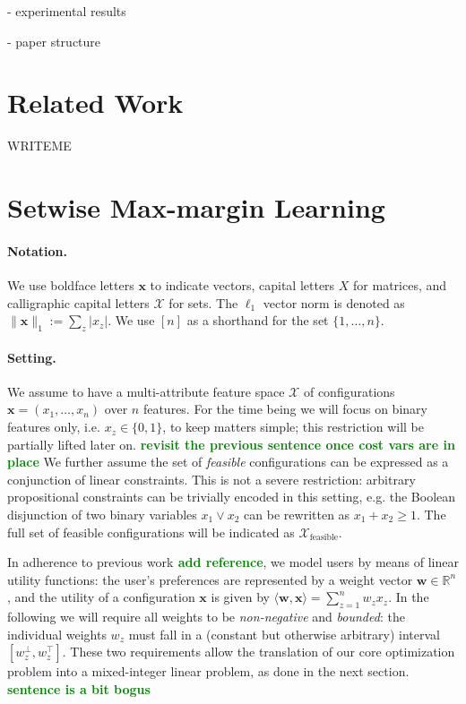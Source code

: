 \documentclass{article}
\renewcommand\[{\begin{equation}}
\renewcommand\]{\end{equation}}
\newcommand{\bbR}{\mathbb{R}}
\newcommand{\calvar}[1]{\ensuremath{\mathcal{#1}}}
\newcommand{\calX}{\calvar{X}}
\newcommand{\vecvar}[1]{\ensuremath{\boldsymbol{#1}}}
\newcommand{\vw}{\vecvar{w}}
\newcommand{\vx}{\vecvar{x}}
\newcommand{\stefano}[1]{{\bf \textcolor{green}{{\fbox{Stefano:} #1}}}}
\begin{document}
- experimental results

- paper structure


\section{Related Work}

WRITEME

\section{Setwise Max-margin Learning}

\paragraph{Notation.} We use boldface letters $\vx$ to indicate vectors,
capital letters $X$ for matrices, and calligraphic capital letters $\calX$ for
sets. The $\ell_1$ vector norm is denoted as $\|\vx\|_1 := \sum_z |x_z|$. We
use $[n]$ as a shorthand for the set $\{1, \ldots, n\}$.

\paragraph{Setting.} We assume to have a multi-attribute feature space $\calX$
of configurations $\vx = (x_1, \ldots, x_n)$ over $n$ features. For the time
being we will focus on binary features only, i.e. $x_z\in\{0,1\}$, to keep
matters simple; this restriction will be partially lifted later on.
\stefano{revisit the previous sentence once cost vars are in place}
We further assume the set of {\em feasible} configurations can be expressed as
a conjunction of linear constraints. This is not a severe restriction:
arbitrary propositional constraints can be trivially encoded in this setting,
e.g. the Boolean disjunction of two binary variables $x_1 \lor x_2$ can be
rewritten as $x_1 + x_2 \ge 1$. The full set of feasible configurations will be
indicated as $\calX_\text{feasible}$.

In adherence to previous work\stefano{add reference}, we model users by means
of linear utility functions: the user's preferences are represented by a weight
vector $\vw\in\bbR^n$, and the utility of a configuration $\vx$ is given by
$\langle \vw, \vx \rangle = \sum_{z=1}^n w_z x_z$. In the following we will
require all weights to be {\em non-negative} and {\em bounded}: the individual
weights $w_z$ must fall in a (constant but otherwise arbitrary) interval
$[w^\bot_z, w^\top_z]$. These two requirements allow the translation of our core
optimization problem into a mixed-integer linear problem, as done in the next
section. \stefano{sentence is a bit bogus}
\end{document}
